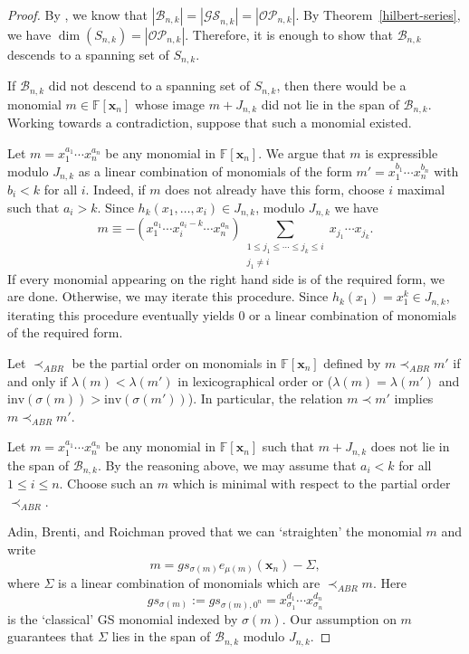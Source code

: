 \documentclass[10pt]{amsart}
\theoremstyle{definition}
\newcommand{\inv}{{\mathrm {inv}}}
\newcommand{\Des}{{\mathrm {Des}}}
\newcommand{\OP}{{\mathcal{OP}}}
\newcommand{\FF}{{\mathbb{F}}}
\newcommand{\BBB}{{\mathcal{B}}}
\newcommand{\GS}{{\mathcal{GS}}}
\newcommand{\xx}{{\mathbf {x}}}
\begin{document}
\begin{proof}
By \cite[Thm. 5.3]{HRS}, we know that $|\BBB_{n,k}| = |\GS_{n,k}| = |\OP_{n,k}|$.  By Theorem~\ref{hilbert-series}, we have
$\dim(S_{n,k}) = |\OP_{n,k}|$.  Therefore, it is enough to show that $\BBB_{n,k}$ descends to a spanning set of
$S_{n,k}$.

If $\BBB_{n,k}$ did not descend to a spanning set of $S_{n,k}$, then there would be a monomial 
$m \in \FF[\xx_n]$ whose image $m + J_{n,k}$ did not lie in the span of $\BBB_{n,k}$.
Working towards a contradiction, suppose that such a monomial 
existed.

Let $m = x_1^{a_1} \cdots x_n^{a_n}$ be any monomial in $\FF[\xx_n]$.  We argue that $m$ is expressible 
modulo $J_{n,k}$ as a linear combination of monomials of the form $m' = x_1^{b_1} \cdots x_n^{b_n}$
with $b_i < k$ for all $i$.  Indeed, if $m$ does not already have this form, choose $i$ maximal such that
$a_i > k$.  Since $h_k(x_1, \dots, x_i) \in J_{n,k}$, modulo $J_{n,k}$ we have
\begin{equation}
m \equiv -(x_1^{a_1} \cdots x_i^{a_i - k} \cdots x_n^{a_n}) \sum_{\substack{1 \leq j_1 \leq \cdots \leq j_k \leq i \\ j_1 \neq i}}
x_{j_1} \cdots x_{j_k}.
\end{equation}
If every monomial appearing on the right hand side is of the required form, we are done.  
Otherwise, we may iterate this procedure.  Since $h_k(x_1) = x_1^k \in J_{n,k}$, iterating this procedure 
eventually yields $0$ or a linear combination of monomials of the required form. 

Let $\prec_{ABR}$ be the partial order on monomials in $\FF[\xx_n]$ defined by $m \prec_{ABR} m'$ if and only if
$\lambda(m) < \lambda(m')$ in lexicographical order or ($\lambda(m) = \lambda(m')$ and
$\inv(\sigma(m)) > \inv(\sigma(m'))$).  In particular, the relation $m \prec m'$ implies $m \prec_{ABR} m'$.

Let $m = x_1^{a_1} \cdots x_n^{a_n}$ be any monomial in $\FF[\xx_n]$ such that $m + J_{n,k}$ does not 
lie in the span of $\BBB_{n,k}$.
By the reasoning above, we may assume that $a_i < k$ for all 
$1 \leq i \leq n$.   Choose such an $m$ which is minimal with respect to the partial order $\prec_{ABR}$.


Adin, Brenti, and Roichman \cite[Lem. 3.5]{ABR} proved that we can `straighten' the monomial $m$
and write
\begin{equation}
m = gs_{\sigma(m)} e_{\mu(m)}(\xx_n) - \Sigma,
\end{equation}
where $\Sigma$ is a linear combination of monomials which are $\prec_{ABR} m$.
Here 
\begin{equation}
gs_{\sigma(m)} := gs_{\sigma(m),0^n} = x_{\sigma_1}^{d_1}\cdots x_{\sigma_n}^{d_n}
\end{equation}
is the `classical' GS monomial indexed by $\sigma(m)$.
Our assumption on $m$ guarantees that $\Sigma$ lies in the span of $\BBB_{n,k}$ modulo $J_{n,k}$.


\end{proof}
\end{document}
